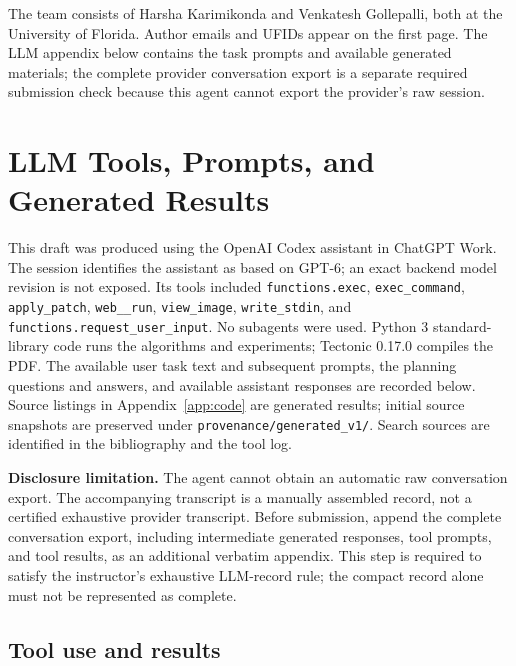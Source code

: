 \documentclass[sigconf,nonacm]{acmart}
\begin{document}
The team consists of Harsha Karimikonda and Venkatesh Gollepalli, both at the
University of Florida. Author emails and UFIDs appear on the first page. The
LLM appendix below contains the task prompts and available generated
materials; the complete provider conversation export is a separate required
submission check because this agent cannot export the provider's raw session.

\section{LLM Tools, Prompts, and Generated Results}
\label{app:llm}
This draft was produced using the OpenAI Codex assistant in ChatGPT Work.
The session identifies the assistant as based on GPT-6; an exact backend model
revision is not exposed. Its tools included \texttt{functions.exec},
\texttt{exec\_command}, \texttt{apply\_patch}, \texttt{web\_\_run},
\texttt{view\_image}, \texttt{write\_stdin}, and
\texttt{functions.request\_user\_input}. No subagents were used. Python 3 standard-library
code runs the algorithms and experiments; Tectonic 0.17.0 compiles the PDF.
The available user task text and subsequent prompts,
the planning questions and answers, and available assistant responses are
recorded below. Source listings in Appendix~\ref{app:code} are generated
results; initial source snapshots are preserved under
\texttt{provenance/generated\_v1/}. Search sources are identified in the
bibliography and the tool log.

\textbf{Disclosure limitation.} The agent cannot obtain an automatic raw
conversation export. The accompanying transcript is a manually assembled
record, not a certified exhaustive provider transcript. Before submission,
append the complete conversation export, including intermediate generated
responses, tool prompts, and tool results, as an additional verbatim appendix.
This step is required to satisfy the instructor's exhaustive LLM-record rule;
the compact record alone must not be represented as complete.



\subsection{Tool use and results}
\end{document}
